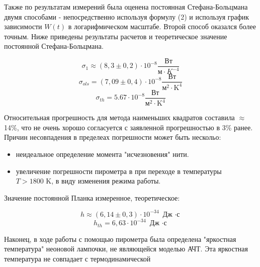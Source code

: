 \documentclass[15pt,a5paper,reqno]{article}
\begin{document}
Также по результатам измерений была оценена постоянная Стефана-Больцмана двумя способами - непосредственно используя формулу (2) и используя график зависимости $W(t)$ в логарифмическом масштабе. Второй способ оказался более точным.
Ниже приведены результаты расчетов и теоретическое значение постоянной Стефана-Больцмана.

\[ \sigma_{1} \approx (8,3 \pm 0,2) \cdot 10^{-8} \frac{Вт}{м \cdot K^{-4}}   \]
\[     \sigma_{ols} = (7,09 \pm 0,4) \cdot 10^{-8} \frac{\text{Вт}}{\text{м}^2 \cdot \text{K}^{4}} \]
\[     \sigma_{th} =  5.67 \cdot 10^{-8}  \frac{\text{Вт}}{\text{м}^2 \cdot \text{K}^{4}} \]

Относительная прогрешность для метода наименьших квадратов составила $ \approx$ 14\%, что не очень хорошо согласуется с заявленной прогрешностью в 3\% ранее.
Причин несовпадения в пределеах погрешности может быть нескольо:

\begin{itemize}
  \item неидеальное определение момента "исчезновения" нити.
  \item увеличение погрешности пирометра в при переходе в температуры $T > 1800 \text{ K}$, в виду изменения режима работы.
\end{itemize}

Значение постоянной Планка измеренное, теоретическое:

\[ h \approx  (6,14 \pm 0,3) \cdot 10^{-34}  \text{ Дж $\cdot$с} \]
\[ h_{th} = 6,63 \cdot 10^{-34}  \text{ Дж $\cdot$с} \]

Наконец, в ходе работы с помощью пирометра была определена "яркостная температура" неоновой лампочки, не являющейся моделью АЧТ. Эта яркостная температура не совпадает с термодинамической
\end{document}
